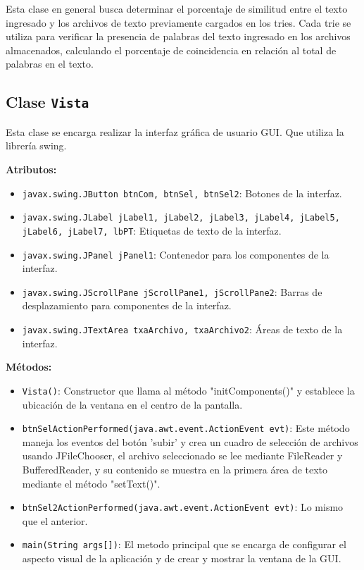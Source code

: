 Esta clase en general busca determinar el porcentaje de similitud entre el texto ingresado y los archivos de texto previamente cargados en los tries. Cada trie se utiliza para verificar la presencia de palabras del texto ingresado en los archivos almacenados, calculando el porcentaje de coincidencia en relación al total de palabras en el texto.


\subsection{Clase \texttt{Vista}}
Esta clase se encarga realizar la interfaz gráfica de usuario GUI. Que utiliza la librería swing.

\textbf{Atributos:}
\begin{itemize}
    \item \texttt{javax.swing.JButton btnCom, btnSel, btnSel2}: Botones de la interfaz.
    \item  \texttt{javax.swing.JLabel jLabel1, jLabel2, jLabel3, jLabel4, jLabel5, jLabel6, jLabel7, lbPT}: Etiquetas de texto de la interfaz.
    \item  \texttt{javax.swing.JPanel jPanel1}: Contenedor para los componentes de la interfaz.
    \item  \texttt{javax.swing.JScrollPane jScrollPane1, jScrollPane2}: Barras de desplazamiento para componentes de la interfaz.
    \item  \texttt{javax.swing.JTextArea txaArchivo, txaArchivo2}: Áreas de texto de la interfaz.
\end{itemize}

\textbf{Métodos:}
\begin{itemize}
    \item \texttt{Vista()}: Constructor que llama al método "initComponents()" y establece la ubicación de la ventana en el centro de la pantalla.
    \item  \texttt{btnSelActionPerformed(java.awt.event.ActionEvent evt)}: Este método maneja los eventos del botón 'subir' y crea un cuadro de selección de archivos usando JFileChooser, el archivo seleccionado se lee mediante FileReader y BufferedReader, y su contenido se muestra en la primera área de texto mediante el método "setText()".
    \item \texttt{btnSel2ActionPerformed(java.awt.event.ActionEvent evt)}: Lo mismo que el anterior.
    \item \texttt{main(String args[])}: El metodo principal que se encarga de configurar el aspecto visual de la aplicación y de crear y mostrar la ventana de la GUI.
\end{itemize}\clearpage

